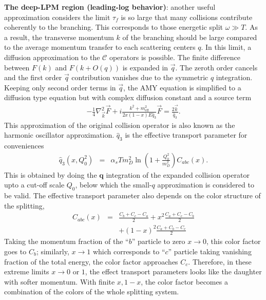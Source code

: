{\bf The deep-LPM region (leading-log behavior)}: another useful approximation considers the limit $\tau_f$ is so large that many collisions contribute coherently to the branching. 
This corresponds to those energetic split $\omega \gg T$.
As a result, the transverse momentum $k$ of the branching should be large compared to the average momentum transfer to each scattering centers $q$.
In this limit, a diffusion approximation to the $\mathcal{C}$ operators is possible.
The finite difference between $F(k)$ and $F(k+O(q))$ is expanded in $\vec{q}$. 
The zeroth order cancels and the first order $\vec{q}$ contribution  vanishes due to the symmetric $q$ integration.
Keeping only second order terms in $\vec{q}$, the AMY equation is simplified to a diffusion type equation but with complex diffusion constant and a source term \cite{Arnold:2008zu}
\begin{eqnarray}
- \frac{1}{4} \nabla^2_{\vec{k}}\vec{F} + i\frac{k^2 + m^2_{\textrm{eff}}}{2x(1-x)E\hat{q}_3}\vec{F} = \frac{2\vec{k}}{\hat{q}_3}.
\end{eqnarray}
This approximation of the original collision operator is also known as the harmonic oscillator approximation.
$\hat{q}_3$ is the effective transport parameter for conveniences 
\begin{eqnarray}
\hat{q}_3(x, Q_0^2) &=& \alpha_s T m_D^2 \ln\left(1+\frac{Q_0^2}{m_D^2}\right) C_{abc}(x).\label{eq:qhat3}
\end{eqnarray}
This is obtained by doing the $\mathbf{q}$ integration of the expanded collision operator upto a cut-off scale $Q_0$, below which the small-$q$ approximation is considered to be valid.
The effective transport parameter also depends on the color structure of the splitting,
\begin{eqnarray}
C_{abc}(x) &=&  \frac{C_b+C_c-C_a}{2} + x^2 \frac{C_a+C_c-C_b}{2} \\
&&+(1-x)^2\frac{C_a+C_b-C_c}{2}
\end{eqnarray}
Taking the momentum fraction of the ``$b$'' particle to zero $x\rightarrow 0$, this color factor goes to $C_b$; similarly, $x\rightarrow 1$ which corresponds to ``$c$'' particle taking vanishing fraction of the total energy, the color factor approaches $C_c$.
Therefore, in these extreme limits $x\rightarrow 0$ or $1$, the effect transport parameters looks like the daughter with softer momentum.
With finite $x, 1-x$, the color factor becomes a combination of the colors of the whole splitting system.


